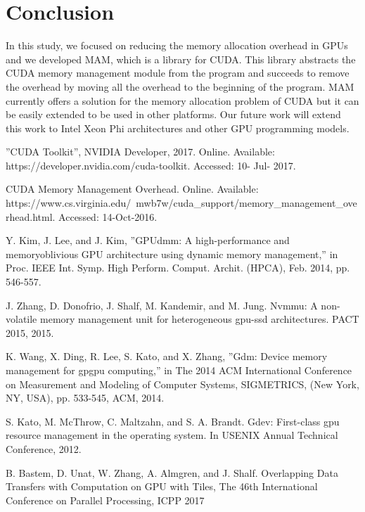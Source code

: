 \documentclass[conference]{IEEEtran}
\begin{document}
\section{Conclusion}
In this study, we focused on reducing the memory allocation overhead in GPUs and we developed MAM, which is a library for CUDA. This library abstracts the CUDA memory management module from the program and succeeds to remove the overhead by moving all the overhead to the beginning of the program. MAM currently offers a solution for the memory allocation problem of CUDA but it can be easily extended to be used in other platforms. Our future work will extend this work to Intel Xeon Phi architectures and other GPU programming models. 


\begin{thebibliography}{1}

''CUDA Toolkit'', NVIDIA Developer, 2017. \lbrack Online\rbrack . Available: https://developer.nvidia.com/cuda-toolkit. \lbrack Accessed: 10- Jul- 2017\rbrack .


CUDA Memory Management Overhead. \lbrack Online\rbrack . Available: https://www.cs.virginia.edu/~mwb7w/cuda\_support/memory\_management\_overhead.html. \lbrack Accessed: 14-Oct-2016\rbrack .

Y. Kim, J. Lee, and J. Kim, ''GPUdmm: A high-performance and memoryoblivious
GPU architecture using dynamic memory management,'' in
Proc. IEEE Int. Symp. High Perform. Comput. Archit. (HPCA), Feb. 2014,
pp. 546-557.

J. Zhang, D. Donofrio, J. Shalf, M. Kandemir, and M. Jung. Nvmmu:
A non-volatile memory management unit for heterogeneous gpu-ssd
architectures. PACT 2015, 2015.

K. Wang, X. Ding, R. Lee, S. Kato, and X. Zhang, ''Gdm:
Device memory management for gpgpu computing,'' in The
2014 ACM International Conference on Measurement and
Modeling of Computer Systems, SIGMETRICS, (New
York, NY, USA), pp. 533-545, ACM, 2014.

S. Kato, M. McThrow, C. Maltzahn, and S. A. Brandt. Gdev:
First-class gpu resource management in the operating system.
In USENIX Annual Technical Conference, 2012.

B. Bastem, D. Unat, W. Zhang, A. Almgren, and J. Shalf. 
Overlapping Data Transfers with Computation on GPU with Tiles, 
The 46th International Conference on Parallel Processing, ICPP 2017


\end{thebibliography}
\end{document}
